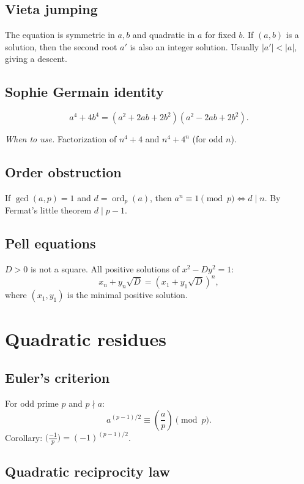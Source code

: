 \subsection{Vieta jumping}
\label{subsec:vieta-jump}

The equation is symmetric in $a,b$ and quadratic in $a$ for fixed $b$. If $(a,b)$ is a solution, then the second root $a'$ is also an integer solution. Usually $|a'|<|a|$, giving a descent.

\subsection{Sophie Germain identity}
\label{subsec:sophie-germain}

$$a^4+4b^4=(a^2+2ab+2b^2)(a^2-2ab+2b^2).$$

\textit{When to use.} Factorization of $n^4+4$ and $n^4+4^n$ (for odd $n$).

\subsection{Order obstruction}
\label{subsec:order-obstruction}

If $\gcd(a,p)=1$ and $d=\operatorname{ord}_p(a)$, then $a^n\equiv1\pmod p\iff d\mid n$. By Fermat's little theorem $d\mid p-1$.

\subsection{Pell equations}
\label{subsec:pell}

$D>0$ is not a square. All positive solutions of $x^2-Dy^2=1$:
$$x_n+y_n\sqrt{D}=(x_1+y_1\sqrt{D})^n,$$
where $(x_1,y_1)$ is the minimal positive solution.

\medskip

\section{Quadratic residues}
\label{sec:quadratic-residues}

\subsection{Euler's criterion}
\label{subsec:euler-criterion}

For odd prime $p$ and $p\nmid a$:
$$a^{(p-1)/2}\equiv\left(\frac{a}{p}\right)\pmod p.$$
Corollary: $\bigl(\frac{-1}{p}\bigr)=(-1)^{(p-1)/2}$.

\subsection{Quadratic reciprocity law}
\label{subsec:quad-reciprocity}

